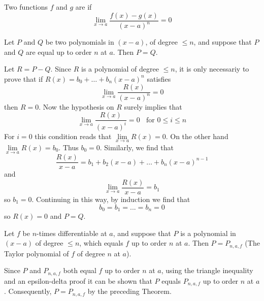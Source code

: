 \documentclass[12pt]{report}
\begin{document}
\begin{defn}{}{}
    Two functions $f$ and $g$ are  if \begin{equation*}
        \lim\limits_{x\rightarrow a}\frac{f(x) - g(x)}{(x-a)^n} = 0
    \end{equation*}
\end{defn}


\begin{thm}{}{}
    Let $P$ and $Q$ be two polynomials in $(x-a)$, of degree $\leq n$, and suppose that $P$ and $Q$ are equal up to order $n$ at $a$. Then $P = Q$.
\end{thm}
\begin{proof*}{}{}
    Let $R= P-Q$. Since $R$ is a polynomial of degree $\leq n$, it is only necessariy to prove that if $R(x) = b_0+\hdots +b_n(x-a)^n$ satisfies \begin{equation*}
        \lim\limits_{x\rightarrow a}\frac{R(x)}{(x-a)^n} = 0
    \end{equation*}
    then $R = 0$. Now the hypothesis on $R$ surely implies that \begin{equation*}
        \lim\limits_{x\rightarrow a}\frac{R(x)}{(x-a)^i} = 0\;\;\text{ for } 0\leq i \leq n
    \end{equation*}
    For $i = 0$ this condition reads that $\lim\limits_{x\rightarrow a}R(x) = 0$. On the other hand $\lim\limits_{x\rightarrow a}R(x) = b_0$. Thus $b_0 = 0$. Similarly, we find that \begin{equation*}
        \frac{R(x)}{x-a} = b_1+b_2(x-a)+\hdots + b_n(x-a)^{n-1}
    \end{equation*}
    and \begin{equation*}
        \lim\limits_{x\rightarrow a}\frac{R(x)}{x-a} = b_1
    \end{equation*}
    so $b_1 = 0$. Continuing in this way, by induction we find that \begin{equation*}
        b_0 = b_1 = ... = b_n = 0
    \end{equation*}
    so $R(x) = 0$ and $P = Q$.
\end{proof*}


\begin{cor}{}{}
    Let $f$ be $n$-times differentiable at $a$, and suppose that $P$ is a polynomial in $(x-a)$ of degree $\leq n$, which equals $f$ up to order $n$ at $a$. Then $P = P_{n,a,f}$ (The Taylor polynomial of $f$ of degree $n$ at $a$).
\end{cor}
\begin{proof*}{}{}
    Since $P$ and $P_{n,a,f}$ both equal $f$ up to order $n$ at $a$, using the triangle inequality and an epsilon-delta proof it can be shown that $P$ equals $P_{n,a,f}$ up to order $n$ at $a$. Consequently, $P = P_{n,a,f}$ by the preceding Theorem.
\end{proof*}
\end{document}
